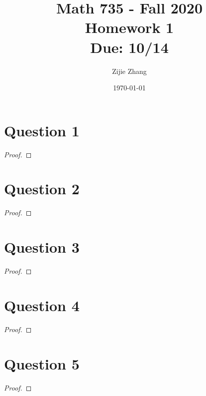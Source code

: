\documentclass{article}
\title{Math 735 - Fall 2020\\
        {\Large \textbf{Homework 1}}\\
        {\normalsize \textbf{Due: 10/14}}
    }
\author{Zijie Zhang}
\date{\today}
\begin{document}
    \maketitle
\section*{Question 1}
    \begin{proof}
    
    \end{proof}

\section*{Question 2}
    \begin{proof}

    \end{proof}


\section*{Question 3}
    \begin{proof}

    \end{proof}


\section*{Question 4}
    \begin{proof}
        
    \end{proof}


\section*{Question 5}
    \begin{proof}

    \end{proof}
\end{document}
